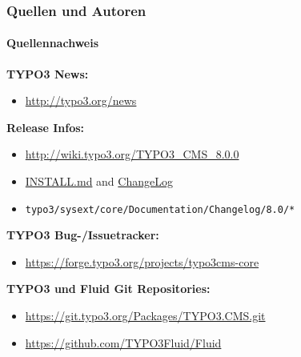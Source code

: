 \begin{frame}[fragile]
	\frametitle{Quellen und Autoren}
	\framesubtitle{Quellennachweis}

	\textbf{TYPO3 News:}
		\begin{itemize}\smaller
			\item \url{http://typo3.org/news}
		\end{itemize}

	\textbf{Release Infos:}
		\begin{itemize}\smaller
			\item \url{http://wiki.typo3.org/TYPO3_CMS_8.0.0}
			\item \href{https://github.com/TYPO3/TYPO3.CMS/blob/master/INSTALL.md}{INSTALL.md} and \href{https://github.com/TYPO3/TYPO3.CMS/tree/master/typo3/sysext/core/Documentation/Changelog}{ChangeLog}
			\item \texttt{typo3/sysext/core/Documentation/Changelog/8.0/*}
		\end{itemize}

	\textbf{TYPO3 Bug-/Issuetracker:}
		\begin{itemize}\smaller
			\item \url{https://forge.typo3.org/projects/typo3cms-core}
		\end{itemize}

	\textbf{TYPO3 und Fluid Git Repositories:}
		\begin{itemize}\smaller
			\item \url{https://git.typo3.org/Packages/TYPO3.CMS.git}
			\item \url{https://github.com/TYPO3Fluid/Fluid}
		\end{itemize}

\end{frame}



